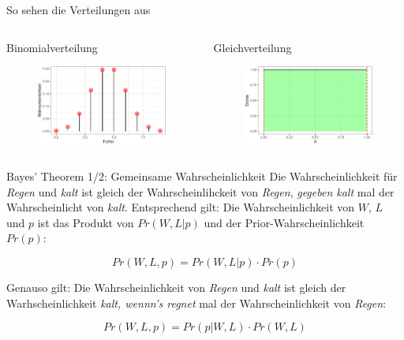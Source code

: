 \documentclass[
  ngerman,
  ignorenonframetext,
]{beamer}
\begin{document}
\begin{frame}{So sehen die Verteilungen aus}
\protect\hypertarget{so-sehen-die-verteilungen-aus}{}
\begin{columns}[T]
\begin{column}{0.5\textwidth}
\begin{block}{Binomialverteilung}
\protect\hypertarget{binomialverteilung}{}
\begin{figure}[H]
\includegraphics[width=0.7\linewidth]{unnamed-chunk-21-1} \end{figure}
\end{block}
\end{column}

\begin{column}{0.5\textwidth}
\begin{block}{Gleichverteilung}
\protect\hypertarget{gleichverteilung}{}
\begin{figure}[H]
\includegraphics[width=0.7\linewidth]{unnamed-chunk-22-1} \end{figure}
\end{block}
\end{column}
\end{columns}
\end{frame}

\begin{frame}{Bayes' Theorem 1/2: Gemeinsame Wahrscheinlichkeit}
\protect\hypertarget{bayes-theorem-12-gemeinsame-wahrscheinlichkeit}{}
Die Wahrscheinlichkeit für \emph{Regen} und \emph{kalt} ist gleich der
Wahrscheinlihckeit von \emph{Regen}, \emph{gegeben kalt} mal der
Wahrscheinlicht von \emph{kalt}. Entsprechend gilt: Die
Wahrscheinlichkeit von \(W\), \(L\) und \(p\) ist das Produkt von
\(Pr(W,L|p)\) und der Prior-Wahrscheinlichkeit \(Pr(p)\):

\[Pr(W,L,p) = Pr(W,L|p) \cdot Pr(p)\]

Genauso gilt: Die Wahrscheinlichkeit von \emph{Regen} und \emph{kalt}
ist gleich der Warhscheinlichkeit \emph{kalt, wennn's regnet} mal der
Wahrscheinlichkeit von \emph{Regen}:

\[Pr(W,L,p) = Pr(p|W,L) \cdot Pr(W, L)\]
\end{frame}
\end{document}
